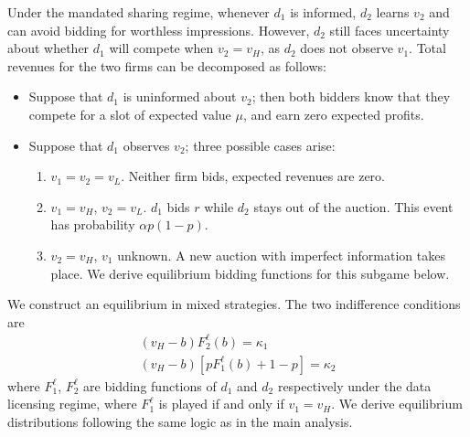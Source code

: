 \noindent Under the mandated sharing regime, whenever $ d_1 $ is informed, $ d_2 $ learns $v_2$ and can avoid bidding for worthless impressions. However, $ d_2 $ still faces uncertainty about whether $ d_1 $ will compete when $v_2 = v_H$, as $ d_2 $ does not observe $v_1$. Total revenues for the two firms can be decomposed as follows:
\begin{itemize}
    \item Suppose that $d_1$ is uninformed about $v_2$; then both bidders know that they compete for a slot of expected value $\mu$, and earn zero expected profits.
    \item Suppose that $d_1$ observes $v_2$; three possible cases arise:
    \begin{enumerate}
        \item $v_1 = v_2 = v_L$. Neither firm bids, expected revenues are zero.
        \item $v_1 = v_H$, $v_2 = v_L$. $d_1$ bids $r$ while $d_2$ stays out of the auction. This event has probability $\alpha p (1-p)$.
        \item $v_2 = v_H$, $v_1$ unknown. A new auction with imperfect information takes place. We derive equilibrium bidding functions for this subgame below.
    \end{enumerate}
\end{itemize}

\noindent We construct an equilibrium in mixed strategies. The two indifference conditions are
\begin{align*}
    (v_H-b)F_2^{\ell}(b) = \kappa_1 \\[5pt]
    (v_H-b)\left[pF_1^{\ell}(b) + 1-p \right] = \kappa_2
\end{align*}
where $F_1^{\ell}$, $F_2^{\ell}$ are bidding functions of $d_1$ and $d_2$ respectively under the data licensing regime, where $F_1^{\ell}$ is played if and only if $v_1 = v_H$. We derive equilibrium distributions following the same logic as in the main analysis. \par

